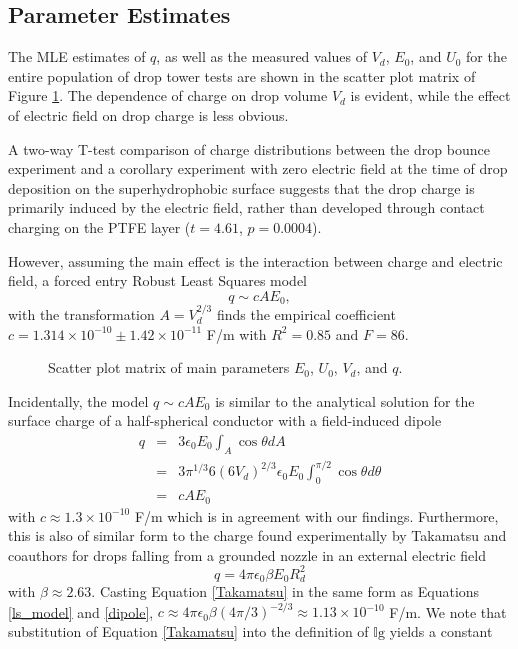 \documentclass[aip,reprint, floatfix]{revtex4-1}
\begin{document}
\subsection{Parameter Estimates}
The MLE estimates of $q$, as well as the measured values of $V_d$, $E_0$, and $U_0$ for the entire population of drop tower tests are shown in the scatter plot matrix of Figure \ref{fig:scatter}. The dependence of charge on drop volume $V_d$ is evident, while the effect of electric field on drop charge is less obvious.

A two-way T-test comparison of charge distributions between the drop bounce experiment and a corollary experiment with zero electric field at the time of drop deposition on the superhydrophobic surface suggests that the drop charge is primarily induced by the electric field, rather than developed through contact charging on the PTFE layer ($t = 4.61$, $p = 0.0004$).

However, assuming the main effect is the interaction between charge and electric field, a forced entry Robust Least Squares model 
\begin{equation}
q \sim cAE_0,
\label{ls_model}
\end{equation} 
with the transformation $A = V_d^{2/3}$ finds the empirical coefficient $c=1.314 \times 10^{-10} \pm  1.42 \times 10^{-11}$ F/m with $R^2 = 0.85$ and $F=86$. 
\begin{figure}[h]
    \centering
    \resizebox{0.5\textwidth}{!}{}
    \caption{Scatter plot matrix of main parameters $E_0$, $U_0$, $V_d$, and $q$.\label{fig:scatter}}
\end{figure}

Incidentally, the model $q \sim cAE_0$ is similar to the analytical solution for the surface charge of a half-spherical conductor with a field-induced dipole \cite{david_j._griffiths_introduction_1999}
\begin{eqnarray}
q &=& 3 \epsilon_0 E_0 \int_A \cos \theta dA \nonumber \\
&=& 3 \pi^{1/3} 6 \left(6 V_d \right)^{2/3} \epsilon_0 E_0 \int^{\pi / 2}_{0} \!\!\!\!\! \cos \theta d\theta \nonumber \\
&=& c A E_0 \label{dipole}
\end{eqnarray}
with $c \approx 1.3 \times 10^{-10}$ F/m which is in agreement with our findings. Furthermore, this is also of similar form to the charge found experimentally by Takamatsu and coauthors for drops falling from a grounded nozzle in an external electric field \cite{takamatsu_theoretical_1981}
\begin{equation}
q = 4 \pi \epsilon_0 \beta E_0 R_d^2
\label{Takamatsu}
\end{equation}
with $\beta \approx 2.63$. Casting Equation \ref{Takamatsu} in the same form as Equations \ref{ls_model} and \ref{dipole}, $c \approx 4 \pi \epsilon_0 \beta (4 \pi/3)^{-2/3} \approx 1.13 \times 10^{-10}$ F/m. We note that substitution of Equation \ref{Takamatsu} into the definition of $\mathbb{I}\mbox{g}$ yields a constant
\end{document}
